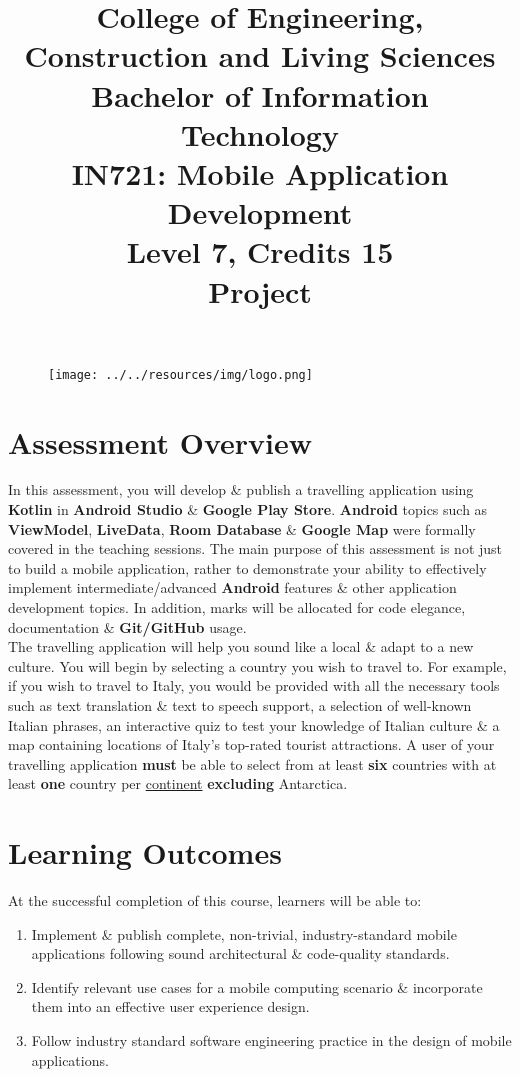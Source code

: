 \documentclass{article}
\author{}
\begin{document}
\begin{figure}
	\centering
	\texttt{[image: ../../resources/img/logo.png]}
\end{figure}

\title{College of Engineering, Construction and Living Sciences\\Bachelor of Information Technology\\IN721: Mobile Application Development\\Level 7, Credits 15\\\textbf{Project}}
\date{}
\maketitle

\section*{Assessment Overview}
In this assessment, you will develop \& publish a travelling application using \textbf{Kotlin} in \textbf{Android Studio} \& \textbf{Google Play Store}. \textbf{Android} topics such as \textbf{ViewModel}, \textbf{LiveData}, \textbf{Room Database} \& \textbf{Google Map} were formally covered in the teaching sessions. The main purpose of this assessment is not just to build a mobile application, rather to demonstrate your ability to effectively implement intermediate/advanced \textbf{Android} features \& other application development topics. In addition, marks will be allocated for code elegance, documentation \& \textbf{Git/GitHub} usage. \\

The travelling application will help you sound like a local \& adapt to a new culture. You will begin by selecting a country you wish to travel to. For example, if you wish to travel to Italy, you would be provided with all the necessary tools such as text translation \& text to speech support, a selection of well-known Italian phrases, an interactive quiz to test your knowledge of Italian culture \& a map containing locations of Italy's top-rated tourist attractions. A user of your travelling application \textbf{must} be able to select from at least \textbf{six} countries with at least \textbf{one} country per \href{https://www.worldometers.info/geography/7-continents/}{continent} \textbf{excluding} Antarctica. 

\section*{Learning Outcomes}
At the successful completion of this course, learners will be able to:
\begin{enumerate}
	\item Implement \& publish complete, non-trivial, industry-standard mobile applications following sound architectural \& code-quality standards.
	\item Identify relevant use cases for a mobile computing scenario \& incorporate them into an effective user experience design.
	\item Follow industry standard software engineering practice in the design of mobile applications.
\end{enumerate}
\end{document}
